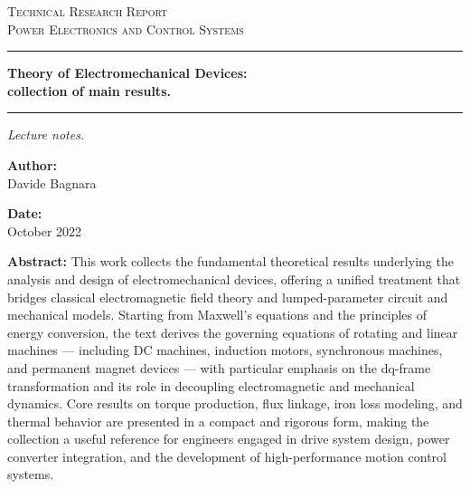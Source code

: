 \documentclass[12pt,a4paper,oneside]{book}
\newcommand{\DocCategory}{Technical Research Report}
\newcommand{\DocField}{Power Electronics and Control Systems}
\newcommand{\DocTitle}{%
	{\fontsize{20}{24}\selectfont\bfseries Theory of Electromechanical Devices:} \\[16pt]
	{\fontsize{16}{20}\selectfont\bfseries collection of main results.}
}
\newcommand{\DocSubtitle}{%
	Lecture notes.
}
\newcommand{\DocAuthor}{Davide Bagnara}
\newcommand{\DocDate}{October 2022}
\newcommand{\DocAbstract}{%
	This work collects the fundamental theoretical results underlying the analysis and design of electromechanical devices, offering a unified treatment that bridges classical electromagnetic field theory and lumped-parameter circuit and mechanical models. Starting from Maxwell's equations and the principles of energy conversion, the text derives the governing equations of rotating and linear machines — including DC machines, induction motors, synchronous machines, and permanent magnet devices — with particular emphasis on the dq-frame transformation and its role in decoupling electromagnetic and mechanical dynamics. Core results on torque production, flux linkage, iron loss modeling, and thermal behavior are presented in a compact and rigorous form, making the collection a useful reference for engineers engaged in drive system design, power converter integration, and the development of high-performance motion control systems.
}
\begin{document}
	\titlepage
	\begin{center}
		{\Large\scshape \DocCategory}\\[8pt]
		{\large\scshape \DocField}
	\end{center}
	
	\vspace{18pt}
	\noindent\rule{\linewidth}{0.8pt}
	
	\vspace{28pt}
	\begin{center}
		\DocTitle
	\end{center}
	
	\vspace{4pt}
	\noindent\rule{\linewidth}{2.2pt}
	
	\vspace{14pt}
	\begin{center}
		\begin{onehalfspace}
			{\large\itshape \DocSubtitle}
		\end{onehalfspace}
	\end{center}
	
	\vspace{18pt}
	
	\begin{minipage}{0.92\linewidth}
		\noindent
		\begin{minipage}[t]{0.48\linewidth}
			\textbf{Author:}\\[2pt]
			\DocAuthor
		\end{minipage}%
		\hfill
		\begin{minipage}[t]{0.48\linewidth}
			\raggedleft
			\textbf{Date:}\\[2pt]
			\DocDate
		\end{minipage}
	\end{minipage}
	\vspace{18pt}
	
	\begin{center}
		\begin{minipage}{0.85\linewidth}
			\footnotesize 
			\begin{onehalfspace}
				\textbf{Abstract:} \DocAbstract
			\end{onehalfspace}
		\end{minipage}
	\end{center}
	
\end{document}
